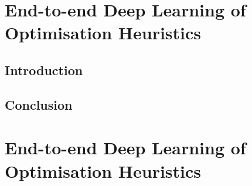 \ifstapled
\chapter{End-to-end Deep Learning of Optimisation Heuristics}
\section{Introduction}
\lipsum[1-2]

\section{Conclusion}
\lipsum[1-2]
\else
\chapter{End-to-end Deep Learning of Optimisation Heuristics}
\label{chap:deeptune}






\fi
